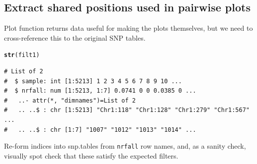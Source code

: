 \documentclass{article}\usepackage[]{graphicx}\usepackage[]{color}
\makeatletter
\newcommand{\hlstd}[1]{\textcolor[rgb]{0.345,0.345,0.345}{#1}}%
\newcommand{\hlkwd}[1]{\textcolor[rgb]{0.737,0.353,0.396}{\textbf{#1}}}%
\newenvironment{kframe}{%
 \def\at@end@of@kframe{}%
 \ifinner\ifhmode%
  \def\at@end@of@kframe{\end{minipage}}%
  \begin{minipage}{\columnwidth}%
 \fi\fi%
 \def\FrameCommand##1{\hskip\@totalleftmargin \hskip-\fboxsep
 \colorbox{shadecolor}{##1}\hskip-\fboxsep
     \hskip-\linewidth \hskip-\@totalleftmargin \hskip\columnwidth}%
 \MakeFramed {\advance\hsize-\width
   \@totalleftmargin\z@ \linewidth\hsize
   \@setminipage}}%
 {\par\unskip\endMakeFramed%
 \at@end@of@kframe}
\newenvironment{knitrout}{}{} %
\makeatother
\begin{document}
\subsection{Extract shared positions used in pairwise plots}

Plot function returns data useful for making the plots themselves, but we need to cross-reference this to the original SNP tables.

\begin{knitrout}\scriptsize
{}\color{fgcolor}\begin{kframe}
\begin{alltt}
\hlkwd{str}\hlstd{(filt1)}
\end{alltt}
\begin{verbatim}
# List of 2
#  $ sample: int [1:5213] 1 2 3 4 5 6 7 8 9 10 ...
#  $ nrfall: num [1:5213, 1:7] 0.0741 0 0 0.0385 0 ...
#   ..- attr(*, "dimnames")=List of 2
#   .. ..$ : chr [1:5213] "Chr1:118" "Chr1:128" "Chr1:279" "Chr1:567" ...
#   .. ..$ : chr [1:7] "1007" "1012" "1013" "1014" ...
\end{verbatim}
\end{kframe}
\end{knitrout}

Re-form indices into snp.tables from \texttt{nrfall} row names, and, as a sanity check, visually spot check that these satisfy the expected filters.
\end{document}
